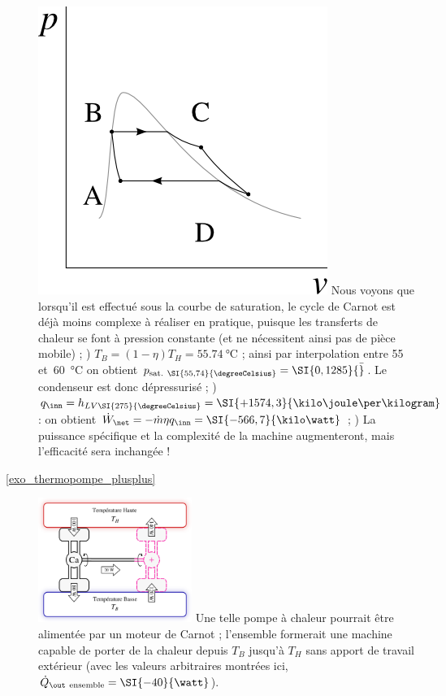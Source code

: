 \begin{description}
					\includegraphics[width=\solutiondiagramwidth]{images/exo_sol_pv_carnot_lv_2.png}
					Nous voyons que lorsqu’il est effectué sous la courbe de saturation, le cycle de Carnot est déjà moins complexe à réaliser en pratique, puisque les transferts de chaleur se font à pression constante (et ne nécessitent ainsi pas de pièce mobile)  ;
					) $T_B = (1 - \eta) T_H = \SI{55,74}{\degreeCelsius}$ ; ainsi par interpolation entre \num{55} et~\SI{60}{\degreeCelsius} on obtient $p_\text{sat. \SI{55,74}{\degreeCelsius}} = \SI{0,1285}{\bar}$. Le condenseur est donc dépressurisé  ;
					) $q_\inn = h_{LV\SI{275}{\degreeCelsius}} = \SI{+1574,3}{\kilo\joule\per\kilogram}$ : on obtient $\dot W_\net = -\dot m \eta q_\inn = \SI{-566,7}{\kilo\watt}$  ;
					) La puissance spécifique et la complexité de la machine augmenteront, mais l’efficacité sera inchangée !
		\item [\ref{exo_thermopompe_plusplus}]
					\includegraphics[width=5cm]{images/carnot_thermopompe_plusplus.png}
					\tab\tab Une telle pompe à chaleur pourrait être alimentée par un moteur de Carnot ; l’ensemble formerait une machine capable de porter de la chaleur depuis $T_B$ jusqu’à $T_H$ sans apport de travail extérieur (avec les valeurs arbitraires montrées ici, $\dot Q_{\out~\text{ensemble}} = \SI{-40}{\watt}$).

\end{description}
